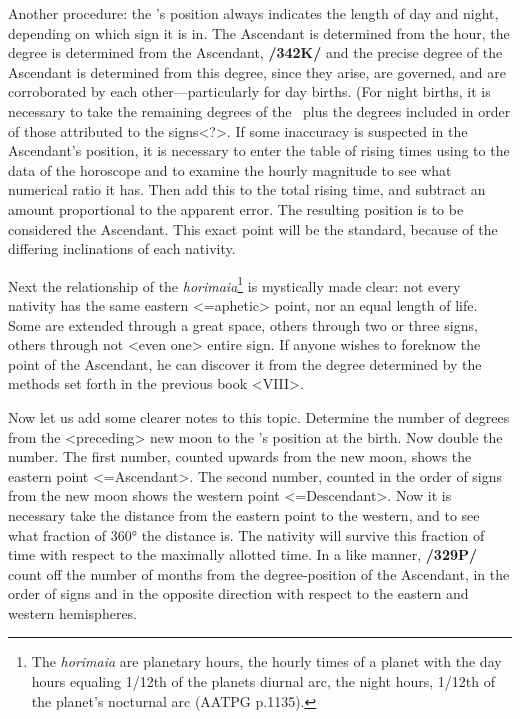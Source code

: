 Another procedure: the \Sun’s position always indicates the length of day and night, depending on which sign it is in. The Ascendant is determined from the hour, the degree is determined from the
Ascendant, \textbf{/342K/} and the precise degree of the Ascendant is determined from this degree, since they arise, are governed, and are corroborated by each other—particularly for day births. (For night births, it is necessary to take the remaining degrees of the \Sun\, plus the degrees included in order of those attributed to
the signs<?>. If some inaccuracy is suspected in the Ascendant’s position, it is necessary to enter the table of rising times using to the data of the horoscope and to examine the hourly magnitude to see what numerical ratio it has. Then add this to the total rising time, and subtract an amount proportional to the apparent error. The resulting position is to be considered the Ascendant. This exact point will be the
standard, because of the differing inclinations of each nativity.

Next the relationship of the \textit{horimaia}\footnote{The \textsl{horimaia} are planetary hours, the hourly times of a planet with the day hours equaling 1/12th of the planets diurnal arc, the night hours, 1/12th of the planet's nocturnal arc (AATPG p.1135).} is mystically made clear: not every nativity has the same eastern <=aphetic> point, nor an equal length of life. Some are extended through a great space, others through two or three signs, others through not <even one> entire sign. If anyone wishes to foreknow the point of the Ascendant, he can discover it from the degree determined by the methods set forth in the previous book <VIII>. 

Now let us add some clearer notes to this topic. Determine the number of degrees from the <preceding> new moon to the \Moon’s position at the birth. Now double the number. The first number, counted upwards from the new moon, shows the eastern point
<=Ascendant>. The second number, counted in the order of signs from the new moon shows the western point <=Descendant>. Now it is necessary take the distance from the eastern point to the western, and to see what fraction of 360° the distance is. The nativity will survive this fraction of time with respect to the maximally allotted time. In a like manner, \textbf{/329P/} count off the number of months from the degree-position of the Ascendant, in the order of signs and in the opposite direction with respect to the eastern and western hemispheres. 

